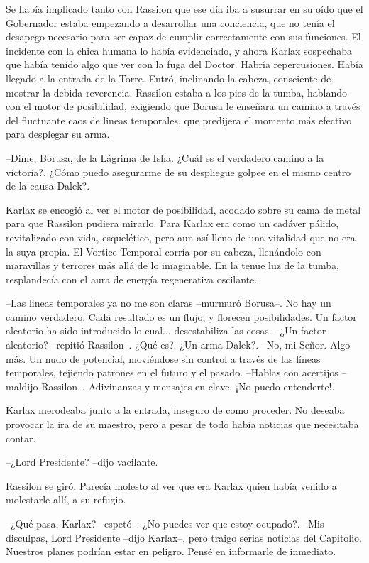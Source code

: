 Se había implicado tanto con Rassilon que ese día iba a susurrar en su oído que el Gobernador estaba empezando a desarrollar una conciencia, que no tenía el desapego necesario para ser capaz de cumplir correctamente con sus funciones. El incidente con la chica humana lo había evidenciado, y ahora Karlax sospechaba que había tenido algo que ver con la fuga del Doctor. Habría repercusiones.
Había llegado a la entrada de la Torre. Entró, inclinando la cabeza, consciente de mostrar la debida reverencia.
Rassilon estaba a los pies de la tumba, hablando con el motor de posibilidad, exigiendo que Borusa le enseñara un camino a través del fluctuante caos de lineas temporales, que predijera el momento más efectivo para desplegar su arma. 

--Dime, Borusa, de la Lágrima de Isha. ¿Cuál es el verdadero camino a la victoria?. ¿Cómo puedo asegurarme de su despliegue golpee en el mismo centro de la causa Dalek?.

Karlax se encogió al ver el motor de posibilidad, acodado sobre su cama de metal para que Rassilon pudiera mirarlo. Para Karlax era como un cadáver pálido, revitalizado con vida, esquelético, pero aun así lleno de una vitalidad que no era la suya propia. El Vortice Temporal corría por su cabeza, llenándolo con maravillas y terrores más allá de lo imaginable. En la tenue luz de la tumba, resplandecía con el aura de energía regenerativa oscilante.

--Las lineas temporales ya no me son claras --murmuró Borusa--. No hay un camino verdadero. Cada resultado es un flujo, y florecen posibilidades. Un factor aleatorio ha sido introducido lo cual... desestabiliza las cosas.
--¿Un factor aleatorio? --repitió Rassilon--. ¿Qué es?. ¿Un arma Dalek?.
--No, mi Señor. Algo más. Un nudo de potencial, moviéndose sin control a través de las líneas temporales, tejiendo patrones en el futuro y el pasado.
--Hablas con acertijos --maldijo Rassilon--. Adivinanzas y mensajes en clave. ¡No puedo entenderte!.

Karlax merodeaba junto a la entrada, inseguro de como proceder. No deseaba provocar la ira de su maestro, pero a pesar de todo había noticias que necesitaba contar. 

--¿Lord Presidente? --dijo vacilante.

Rassilon se giró. Parecía molesto al ver que era Karlax quien había venido a molestarle allí, a su refugio.

--¿Qué pasa, Karlax? --espetó--. ¿No puedes ver que estoy ocupado?.
--Mis disculpas, Lord Presidente --dijo Karlax--, pero traigo serias noticias del Capitolio. Nuestros planes podrían estar en peligro. Pensé en informarle de inmediato.

